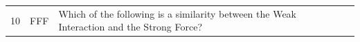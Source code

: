 \documentclass[10pt]{article}
\begin{document}
\begin{tiny}
\begin{longtable}{r p{0.3in} p{1.212in} p{3.8in}}
    10 &          FFF &                                                                                                                                                                                        Which of the following is a similarity between the Weak Interaction and the Strong Force? &                                                                                                                                                                                                                                                                                                                                                                                                                                                                                                                                                                                                                                                                                                                                                                                                                                                                                                                                                                                                                                                                                                                                                                                                                                                                                                                                                                                                                                                                                                                                                                                                                                                                                                                                                                                                                                                                                                                                                                                                                                                                                                                                                                                                                                                                                                                                                                                                                                                                                                                                                                                                                                                                                                                                                                                                                                                                                                                                                                                                                                                                                               
\end{longtable}
\end{tiny}
\end{document}
